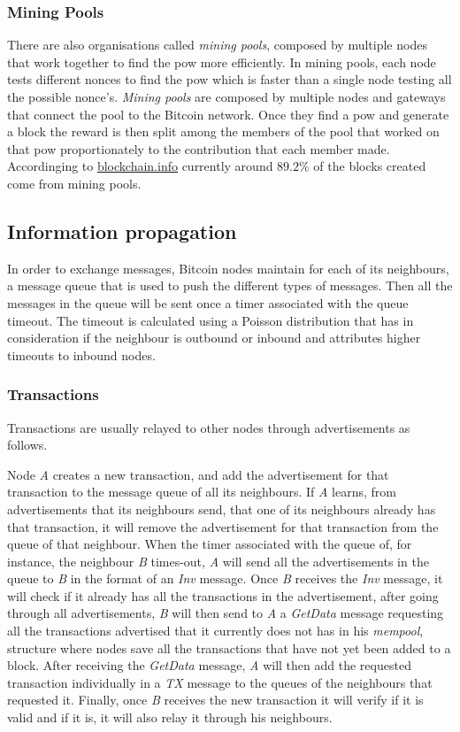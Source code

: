 \subsubsection{Mining Pools}
There are also organisations called \textit{mining pools}, composed by multiple nodes that work together to find the \acrshort{pow} more efficiently. In mining pools, each node tests different nonces to find the \acrshort{pow} which is faster than a single node testing all the possible nonce's. \textit{Mining pools} are composed by multiple nodes and gateways that connect the pool to the Bitcoin network. Once they find a \acrshort{pow} and generate a block the reward is then split among the members of the pool that worked on that \acrshort{pow} proportionately to the contribution that each member made. Accordinging to \url{blockchain.info} currently around $89.2\%$ of the blocks created come from mining pools.

\subsection{Information propagation}
\label{sec:dataexchange}
In order to exchange messages, Bitcoin nodes maintain for each of its neighbours, a message queue that is used to push the different types of messages. Then all the messages in the queue will be sent once a timer associated with the queue timeout. The timeout is calculated using a Poisson distribution that has in consideration if the neighbour is outbound or inbound and attributes higher timeouts to inbound nodes.

\subsubsection{Transactions}
Transactions are usually relayed to other nodes through advertisements as follows.

Node \textit{A} creates a new transaction, and add the advertisement for that transaction to the message queue of all its neighbours. If \textit{A} learns, from advertisements that its neighbours send, that one of its neighbours already has that transaction, it will remove the advertisement for that transaction from the queue of that neighbour. When the timer associated with the queue of, for instance, the neighbour \textsl{B} times-out, \textsl{A} will send all the advertisements in the queue to \textit{B} in the format of an \textsl{Inv} message. Once \textsl{B} receives the \textsl{Inv} message, it will check if it already has all the transactions in the advertisement, after going through all advertisements, \textit{B} will then send to \textsl{A} a \textsl{GetData} message requesting all the transactions advertised that it currently does not has in his \emph{mempool}, structure where nodes save all the transactions that have not yet been added to a block. After receiving the \textsl{GetData} message, \textit{A} will then add the requested transaction individually in a \textsl{TX} message to the queues of the neighbours that requested it. Finally, once \textsl{B} receives the new transaction it will verify if it is valid and if it is, it will also relay it through his neighbours.


